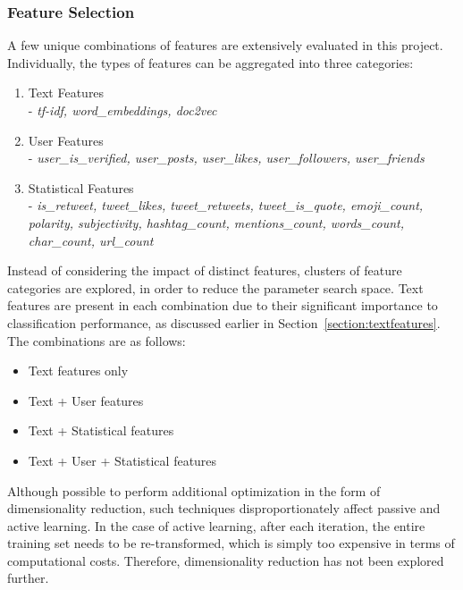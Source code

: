 \documentclass[a4paper,12pt]{article}
\begin{document}
\subsubsection{Feature Selection}
A few unique combinations of features are extensively evaluated in this project. Individually, the types of features can be aggregated into three categories:
\begin{enumerate}
    \item Text Features\\
    - \emph{tf-idf, word\_embeddings, doc2vec}
    \item User Features\\
    - \emph{user\_is\_verified, user\_posts, user\_likes, user\_followers, user\_friends}
    \item Statistical Features\\
    - \emph{is\_retweet, tweet\_likes, tweet\_retweets, tweet\_is\_quote, emoji\_count, polarity, subjectivity, hashtag\_count, mentions\_count, words\_count, char\_count, url\_count}
\end{enumerate}
Instead of considering the impact of distinct features, clusters of feature categories are explored, in order to reduce the parameter search space. Text features are present in each combination due to their significant importance to classification performance, as discussed earlier in Section~\ref{section:textfeatures}. The combinations are as follows:
\begin{itemize}
    \item Text features only
    \item Text + User features
    \item Text + Statistical features
    \item Text + User + Statistical features
\end{itemize}
Although possible to perform additional optimization in the form of dimensionality reduction, such techniques disproportionately affect passive and active learning. In the case of active learning, after each iteration, the entire training set needs to be re-transformed, which is simply too expensive in terms of computational costs. Therefore, dimensionality reduction has not been explored further.
\end{document}
